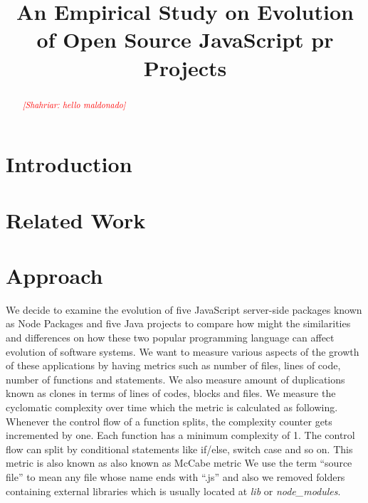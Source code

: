 \documentclass[conference]{IEEEtran}
\newcommand{\shahriar}[1]{\textcolor{red}{{\it [Shahriar: #1]}}}
\begin{document}
	\title{An Empirical Study on Evolution of Open Source JavaScript pr Projects}
	
	\author{
		
		}
	
	\maketitle
	
	\begin{abstract}
		\shahriar{hello maldonado}
		
	\end{abstract}
	
	\IEEEpeerreviewmaketitle
	
	\section{Introduction}
	\label{sec:introduction}
	
	\section{Related Work}
	\label{sec:related_work}
	
	
	
	\section{Approach}
	\label{sec:approach}
We decide to examine the evolution of five JavaScript server-side packages known as Node Packages and five Java projects to compare how might the similarities and differences on how these two popular programming language can affect evolution of software systems. 
We want to measure various aspects of the growth of these applications by having metrics such as number of files, lines of code, number of functions and statements. We also measure amount of duplications known as clones in terms of lines of codes, blocks and files. We measure the cyclomatic complexity over time which the metric is calculated as following. Whenever the control flow of a function splits, the complexity counter gets incremented by one. Each function has a minimum complexity of 1. The control flow can split by conditional statements like if/else, switch case and so on. This metric is also known as also known as McCabe metric
We use the term “source file” to mean any file whose name ends with “.js” and also we removed folders containing external libraries which is usually located at \textit{lib} or \textit{node\_modules}. 
	
\end{document}
